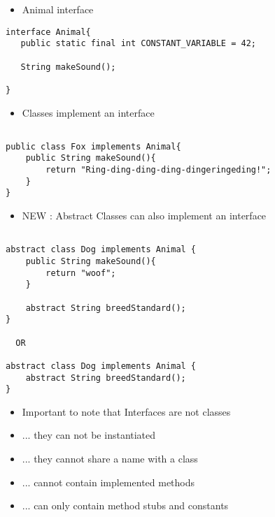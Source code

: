 \documentclass{beamer}
\begin{document}
\begin{frame}[fragile]
\begin{itemize}
\item Animal interface
\end{itemize}
\begin{block}{}
\begin{lstlisting}
interface Animal{
   public static final int CONSTANT_VARIABLE = 42;
   
   String makeSound();

}
\end{lstlisting}
\end{block}
\end{frame}

\begin{frame}[fragile]
\begin{itemize}
\item Classes implement an interface 
\end{itemize}
\begin{block}{}
\begin{lstlisting}

public class Fox implements Animal{
    public String makeSound(){
    	return "Ring-ding-ding-ding-dingeringeding!";
    }
}
\end{lstlisting}
\end{block}
\end{frame}

\begin{frame}[fragile]
\begin{itemize}
\item NEW : Abstract Classes can also implement an interface 
\end{itemize}
\begin{block}{}
\begin{lstlisting}

abstract class Dog implements Animal { 
	public String makeSound(){
	    return "woof";
	}
	
	abstract String breedStandard();
}

  OR

abstract class Dog implements Animal { 
	abstract String breedStandard();
}
\end{lstlisting}
\end{block}
\end{frame}

\begin{frame}
\begin{itemize}
\item Important to note that Interfaces are not classes
\item ... they can not be instantiated 
\item ... they cannot share a name with a class
\item ... cannot contain implemented methods 
\item ... can only contain method stubs and constants
\end{itemize}
\end{frame}
\end{document}
